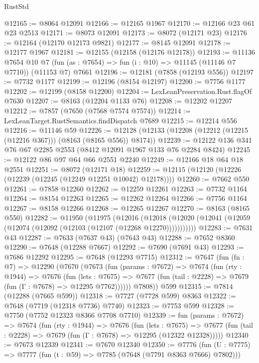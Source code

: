 \begin{lexlean}{RustStd}
\begin{coremodule}
@12165 := @8064 @12091
@12166 := @12165 @1967
@12170 := @12166 @23 @61 @23 @2513
@12171 := @8073 @12091
@12173 := @8072 (@12171 @23)
@12176 := @12164 (@12170 @12173 @9821)
@12177 := @8145 @12091
@12178 := @12177 @1967
@12181 := @12155 (@12158 (@12176 @12178))
@12193 := @11136
    @7654
    @10
    @7
    (fun (as : @7654) => fun (i : @10) => @11145 (@11146 @7 @7710))
    (@11153 @7)
    @7661
@12196 := @12181 (@7858 (@12193 @556))
@12197 := @7732 @1177
@12199 := @12196 (@8154 @12197)
@12200 := @7756 @1177
@12202 := @12199 (@8158 @12200)
@12204 := LexLeanPreservation.Rust.flagOf @7630
@12207 := @8163 (@12204 @1133 @76)
@12208 := @12202 @12207
@12212 := @7857 (@7650 (@7568 @7574 @7574))
@12214 := LexLeanTarget.RustSemantics.findDispatch @7689
@12215 := @12214 @556
@12216 := @11146 @59
@12226 := @12128 (@12133 (@12208 (@12212 (@12215 (@12216 @367))) (@8163 (@8165 @556)) @8174))
@12239 := @12122 @136 @341 @76 @67 @2285 @2553 (@8412 @12091 @1967 @133 @76 @2284 @8424)
@12245 := @12122 @86 @97 @64 @66 @2551 @2240
@12249 := @12166 @18 @64 @18 @2551
@12251 := @8072 (@12171 @18)
@12259 := @12115 (@12120 (@12226 (@12239 (@12245 (@12249 @12251 @10042) @12178))))
@12260 := @7662 @550
@12261 := @7858 @12260
@12262 := @12259 @12261
@12263 := @7732 @1164
@12264 := @8154 @12263
@12265 := @12262 @12264
@12266 := @7756 @1164
@12267 := @8158 @12266
@12268 := @12265 @12267
@12270 := @8163 (@8165 @550)
@12282 := @11950
    (@11975
      (@12016
        (@12018 (@12020 (@12041 (@12059 (@12074 (@12092 (@12103 (@12107 (@12268 @12270)))))))))))
@12283 := @7631 @43
@12287 := @7633 (@7637 @43) (@7643 @43)
@12288 := @7652 @8360
@12290 := @7648 (@12288 @7667)
@12292 := @7690 (@7691 @43)
@12293 := @7686 @12292
@12295 := @7648 (@12293 @7715)
@12312 := @7647
    (fun (fn : @7) =>
    @12290
      (@7670
        (@7673
          (fun (params : @7672) =>
          @7674
            (fun (rty : @1944) =>
            @7676
              (fun (lets : @7675) =>
              @7677 (fun (tail : @2228) => @7679 (fun (Γ : @7678) => @12295 @7762))))))
        @7808))
    @599
@12315 := @7814 (@12288 (@7665 @599))
@12318 := @7727 (@7728 @599) @8363
@12322 := @7648 (@7719 (@12318 @7736) @7740)
@12323 := @7753 @599
@12328 := @7750 (@7752 @12323 @8366 @7708 @7710)
@12339 := fun (params : @7672) =>
  @7674
    (fun (rty : @1944) =>
    @7676
      (fun (lets : @7675) =>
      @7677 (fun (tail : @2228) => @7679 (fun (Γ : @7678) => @12295 (@12322 @12328)))))
@12340 := @7673 @12339
@12341 := @7670 @12340
@12350 := @7776
    (fun (U : @7775) => @7777 (fun (t : @59) => @7785 (@7648 (@7791 @8363 @7666) @7802)))

\end{coremodule}
\end{lexlean}
